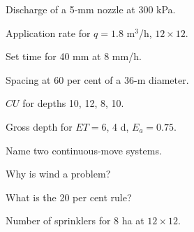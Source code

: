 \begin{exlist}
\item Discharge of a 5-mm nozzle at 300 kPa.
\item Application rate for $q=1.8$ m$^3$/h, $12\times12$.
\item Set time for 40 mm at 8 mm/h.
\item Spacing at 60 per cent of a 36-m diameter.
\item $CU$ for depths 10, 12, 8, 10.
\item Gross depth for $ET=6$, 4 d, $E_a=0.75$.\exans{32 mm}
\item Name two continuous-move systems.
\item Why is wind a problem?
\item What is the 20 per cent rule?
\item Number of sprinklers for 8 ha at $12\times12$.
\end{exlist}
